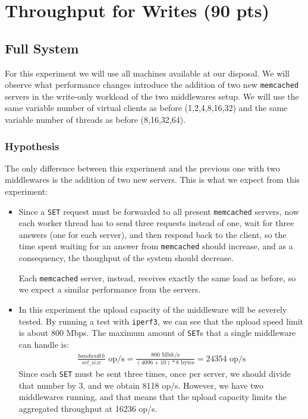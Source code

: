 \documentclass[11pt,a4paper]{article}
\renewcommand{\t}[1]{%
	{\texttt{#1}}}
\begin{document}
\section{Throughput for Writes (90 pts)}

\subsection{Full System}

For this experiment we will use all machines available at our disposal.  We
will observe what performance changes introduce the addition of two new
\t{memcached} servers in the write-only workload of the two middlewares setup.
We will use the same variable number of virtual clients as before (1,2,4,8,16,32)
and the same variable number of threads as before (8,16,32,64).

\subsubsection{Hypothesis}

The only difference between this experiment and the previous one with two middlewares is the addition of two new servers.
This is what we expect from this experiment:
\begin{itemize}
	\item Since a \t{SET} request must be forwarded to all present
		\t{memcached} servers, now each worker thread has to send three
		requests instead of one, wait for three answers (one for each server),
		and then respond back to the client, so the time spent waiting for an answer
		from \t{memcached} should increase, and as a consequency, the thoughput of the
		system should decrease.

		Each \t{memcached} server, instead, receives exactly the same load as before, so we expect a similar performance 
		from the servers.

	\item In this experiment the upload capacity of the middleware will be severely tested. By running a test 
		with \t{iperf3}, we can see that the upload speed limit is about 800 Mbps.
		The maximum amount of \t{SET}s that a single middleware can handle is:
		\begin{align*}
			\frac{bandwidth}{set\_size} \text{ op/s} = \frac{800 \text{ Mbit/s}}{(4096+10)*8 \text{ bytes}} =  
			24354 \text{ op/s} 
		\end{align*}
		Since each \t{SET} must be sent three times, once per server, we should
		divide that number by 3, and we obtain 8118 op/s. However, we have two
		middlewares running, and that means that the upload capacity limits the
		aggregated throughput at 16236 op/s.
\end{itemize}
\end{document}
